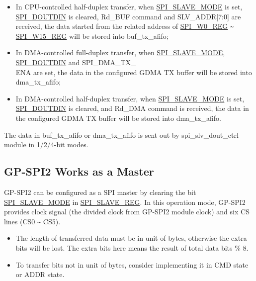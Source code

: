 \documentclass[main\_\_EN.tex]{subfiles}
\begin{document}
\begin{itemize}
\begin{itemize}
        \item In CPU-controlled half-duplex transfer, when \hyperref[fielddesc:SPISLAVEMODE]{SPI\_SLAVE\_MODE} is set, \hyperref[fielddesc:SPIDOUTDIN]{SPI\_DOUTDIN} is cleared, Rd\_BUF command and SLV\_ADDR[7:0] are received, the data started from the related address of \hyperref[regdesc:SPIW0REG]{SPI\_W0\_REG} \verb+~+ \hyperref[regdesc:SPIW15REG]{SPI\_W15\_REG} will be stored into buf\_tx\_afifo;

        \item In DMA-controlled full-duplex transfer, when \hyperref[fielddesc:SPISLAVEMODE]{SPI\_SLAVE\_MODE}, \hyperref[fielddesc:SPIDOUTDIN]{SPI\_DOUTDIN} and SPI\_DMA\_TX\_\\ENA are set, the data in the configured GDMA TX buffer will be stored into dma\_tx\_afifo;

        \item In DMA-controlled half-duplex transfer, when \hyperref[fielddesc:SPISLAVEMODE]{SPI\_SLAVE\_MODE} is set, \hyperref[fielddesc:SPIDOUTDIN]{SPI\_DOUTDIN} is cleared, and Rd\_DMA command is received, the data in the configured GDMA TX buffer will be stored into dma\_tx\_afifo.

    \end{itemize}

The data in buf\_tx\_afifo or dma\_tx\_afifo is sent out by spi\_slv\_dout\_ctrl module in 1/2/4-bit modes.
\end{itemize}

\subsection{GP-SPI2 Works as a Master}\label{sec:spi-func-descr-gp-spi2-master}

GP-SPI2 can be configured as a SPI master by clearing the bit \hyperref[fielddesc:SPISLAVEMODE]{SPI\_SLAVE\_MODE} in \hyperref[regdesc:SPISLAVEREG]{SPI\_SLAVE\_REG}. In this operation mode, GP-SPI2 provides clock signal (the divided clock from GP-SPI2 module clock) and six CS lines (CS0 \verb+~+ CS5).

\begin{tiplisting}
\vspace{-2em}
\begin{itemize}
    \item The length of transferred data must be in unit of bytes, otherwise the extra bits will be lost. The extra bits here means the result of total data bits \% 8.
    \item To transfer bits not in unit of bytes, consider implementing it in CMD state or ADDR state.
\end{itemize}
\end{tiplisting}
\end{document}
